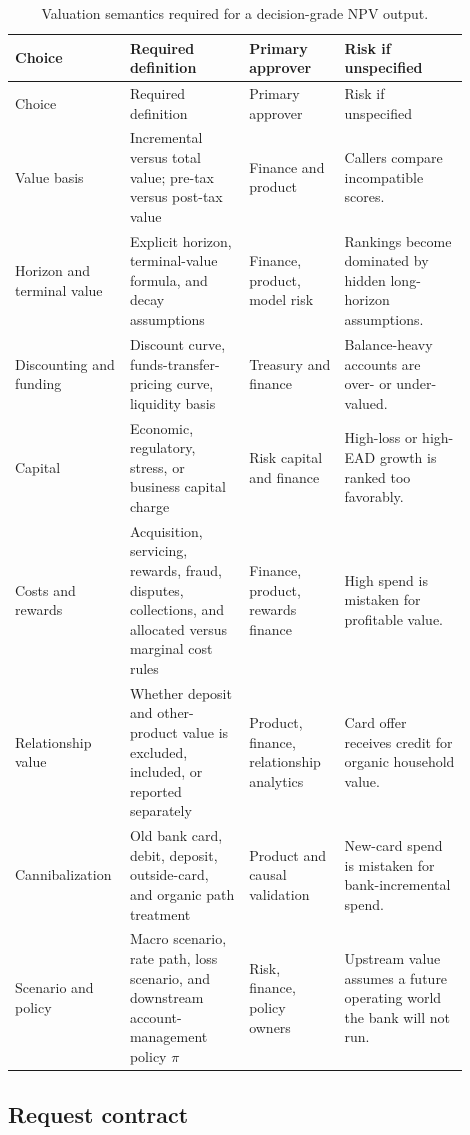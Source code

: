\documentclass[11pt]{article}
\newcommand{\1}{\mathbf{1}}
\begin{document}
\begin{longtable}{L{0.19\linewidth}L{0.25\linewidth}L{0.20\linewidth}L{0.26\linewidth}}
\caption{Valuation semantics required for a decision-grade NPV output.}
\label{tab:valuation-semantics}\\
\toprule
Choice & Required definition & Primary approver & Risk if unspecified \\
\midrule
\endfirsthead
\toprule
Choice & Required definition & Primary approver & Risk if unspecified \\
\midrule
\endhead
Value basis
  & Incremental versus total value; pre-tax versus post-tax value
  & Finance and product
  & Callers compare incompatible scores. \\
Horizon and terminal value
  & Explicit horizon, terminal-value formula, and decay assumptions
  & Finance, product, model risk
  & Rankings become dominated by hidden long-horizon assumptions. \\
Discounting and funding
  & Discount curve, funds-transfer-pricing curve, liquidity basis
  & Treasury and finance
  & Balance-heavy accounts are over- or under-valued. \\
Capital
  & Economic, regulatory, stress, or business capital charge
  & Risk capital and finance
  & High-loss or high-EAD growth is ranked too favorably. \\
Costs and rewards
  & Acquisition, servicing, rewards, fraud, disputes, collections, and allocated
    versus marginal cost rules
  & Finance, product, rewards finance
  & High spend is mistaken for profitable value. \\
Relationship value
  & Whether deposit and other-product value is excluded, included, or reported
    separately
  & Product, finance, relationship analytics
  & Card offer receives credit for organic household value. \\
Cannibalization
  & Old bank card, debit, deposit, outside-card, and organic path treatment
  & Product and causal validation
  & New-card spend is mistaken for bank-incremental spend. \\
Scenario and policy
  & Macro scenario, rate path, loss scenario, and downstream account-management
    policy $\pi$
  & Risk, finance, policy owners
  & Upstream value assumes a future operating world the bank will not run. \\
\bottomrule
\end{longtable}

\subsection{Request contract}
\label{subsec:request-contract}
\end{document}
